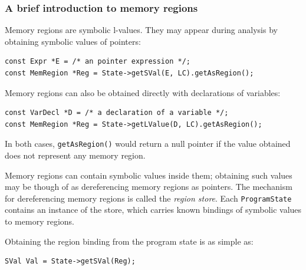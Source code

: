 \documentclass[a4paper,12pt]{article}
\newenvironment{nobr}{\begin{minipage}{\textwidth}\setlength\parskip{1em}
}{\end{minipage}\ignorespacesafterend}
\begin{document}
\begin{nobr}
\subsubsection{A brief introduction to memory regions}

Memory regions are symbolic l-values. They may appear during analysis by obtaining symbolic values of pointers:

\begin{lstlisting}[style=cplusplus,numbers=none]
const Expr *E = /* an pointer expression */;
const MemRegion *Reg = State->getSVal(E, LC).getAsRegion();
\end{lstlisting}
\end{nobr}

\begin{nobr}
Memory regions can also be obtained directly with declarations of variables:

\begin{lstlisting}[style=cplusplus,numbers=none]
const VarDecl *D = /* a declaration of a variable */;
const MemRegion *Reg = State->getLValue(D, LC).getAsRegion();
\end{lstlisting}
\end{nobr}

In both cases, \lstinline|getAsRegion()| would return a null pointer if the value obtained does not represent any memory region.

Memory regions can contain symbolic values inside them; obtaining such values may be though of as dereferencing memory regions as pointers. The mechanism for dereferencing memory regions is called the \emph{region store}. Each \lstinline|ProgramState| contains an instance of the store, which carries known bindings of symbolic values to memory regions.

\begin{nobr}
Obtaining the region binding from the program state is as simple as:

\begin{lstlisting}[style=cplusplus,numbers=none]
SVal Val = State->getSVal(Reg);
\end{lstlisting}
\end{nobr}
\end{document}
